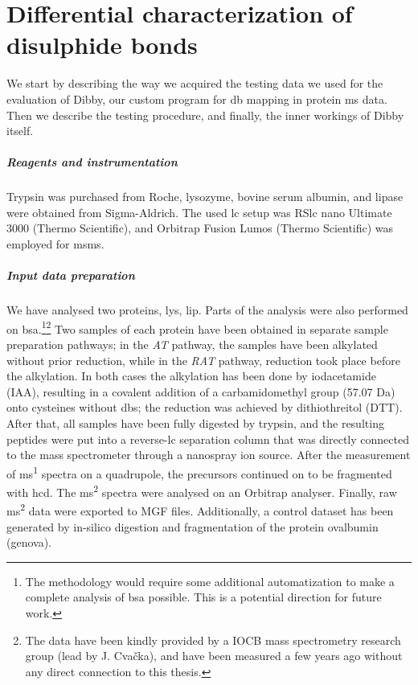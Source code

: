 
\chapter{Differential characterization of disulphide bonds}

We start by describing the way we acquired the testing data we used for the evaluation of Dibby, our custom program for \gls*{db} mapping in protein \gls*{ms} data. Then we describe the testing procedure, and finally, the inner workings of Dibby itself.

\paragraph{Reagents and instrumentation} Trypsin was purchased from Roche, lyso\-zyme, bovine serum albumin, and lipase were obtained from Sigma-Aldrich. The used \gls*{lc} setup was RS\gls*{lc} nano Ultimate 3000 (Thermo Scientific), and Orbitrap Fusion Lumos (Thermo Scientific) was employed for \gls*{msms}.

\paragraph{Input data preparation} We have analysed two proteins, \gls*{lys}, \gls*{lip}. Parts of the analysis were also performed on \gls*{bsa}.\footnote{The methodology would require some additional automatization to make a complete analysis of \gls*{bsa} possible. This is a potential direction for future work.}\footnote{The data have been kindly provided by a IOCB mass spectrometry research group (lead by J. Cvačka), and have been measured a few years ago without any direct connection to this thesis.} Two samples of each protein have been obtained in separate sample preparation pathways; in the \emph{AT} pathway, the samples have been alkylated without prior reduction, while in the \emph{RAT} pathway, reduction took place before the alkylation. In both cases the alkylation has been done by iodacetamide (IAA), resulting in a covalent addition of a carbamidomethyl group (57.07 Da) onto cysteines without \glspl*{db}; the reduction was achieved by dithiothreitol (DTT). After that, all samples have been fully digested by trypsin, and the resulting peptides were put into a reverse-\gls*{lc} separation column that was directly connected to the mass spectrometer through a nanospray ion source. After the measurement of \gls*{ms}\textsuperscript{1} spectra on a quadrupole, the precursors continued on to be fragmented with \gls*{hcd}\@. The \gls*{ms}\textsuperscript{2} spectra were analysed on an Orbitrap analyser. Finally, raw \gls*{ms}\textsuperscript{2} data were exported to MGF files. Additionally, a control dataset has been generated by in-silico digestion and fragmentation of the protein ovalbumin (\gls*{genova}).

